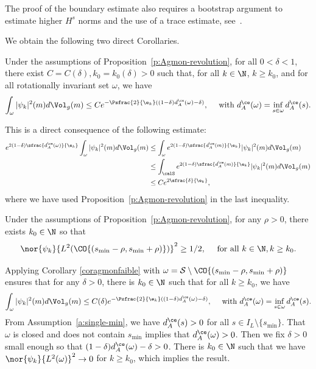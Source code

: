 The proof of the boundary estimate also requires a bootstrap argument to estimate higher $H^s$ norms and the use of a trace estimate, see~\cite[Prop.\,3.3.1 \&~3.3.4]{Helffer:booksemiclassic}.

We obtain the following two direct Corollaries.
\begin{corollary}
\label{coragmonfaible}
Under the assumptions of Proposition~\ref{p:Agmon-revolution}, for all $0<\delta< 1$, there exist $C=C(\delta),k_0=k_0(\delta)>0$ such that, for all $k \in \N$, $k \geq k_0$, and for all rotationally invariant set $\omega$, we have
\[
\int_{\omega} |\psi_k|^2(m) d\Vol_g(m)
\leq C e^{-\Psfrac{2}{\e_k} ((1-\delta)d_A^{\ce}(\omega) - \delta) }, \quad \text{ with } d_A^{\ce}(\omega) = \inf_{s\in \omega} d_A^{\ce}(s).
\]
\end{corollary}
\bnp
This is a direct consequence of the following estimate:
\begin{align*}
e^{2(1-\delta)\sfrac{ d_A^{\ce}(\omega)}{\e_k}} \int_{\omega} |\psi_k|^2(m) d\Vol_g(m) & \leq\int_{\omega} e^{2(1-\delta)\sfrac{ d_A^{\ce}(m)}{\e_k}} |\psi_k|^2(m) d\Vol_g(m) \\
& \leq \int_{\calS} e^{2(1-\delta)\sfrac{ d_A^{\ce}(m)}{\e_k}} |\psi_k|^2(m) d\Vol_g(m)\\
&\leq C e^{2\sfrac{\delta}{\e_k}},
\end{align*}
where we have used Proposition~\ref{p:Agmon-revolution} in the last inequality.
\enp
\begin{corollary}
\label{corpresx0}
Under the assumptions of Proposition~\ref{p:Agmon-revolution}, for any $\rho>0$, there exists $k_0\in \N$ so that
\[
\nor{\psi_k}{L^2(\CO{(s_{\min}-\rho, s_{\min} +\rho)})}^2\geq 1/2, \quad \text{ for all } k\in \N, k\geq k_0.
\]
\end{corollary}
\bnp
Applying Corollary \ref{coragmonfaible} with $\omega=\mathcal{S}\setminus\CO{(s_{\min}-\rho, s_{\min} +\rho)}$ ensures that for any $\delta>0$, there is $k_0\in \N$ such that for all $k\geq k_0$, we have
\[
\int_{\omega} |\psi_k|^2(m) d\Vol_g(m)
\leq C(\delta) e^{-\Psfrac{2}{\e_k} ((1-\delta)d_A^{\ce}(\omega) - \delta) }, \quad \text{ with } d_A^{\ce}(\omega) = \inf_{s\in \omega} d_A^{\ce}(s).
\]
From Assumption~\ref{a:single-min}, we have $d_A^{\ce}(s)>0$ for all $s \in I_L\setminus \{s_{\min}\}$. That $\omega$ is closed and does not contain $s_{\min}$ implies that $d_A^{\ce}(\omega)>0$.
Then we fix $\delta>0$ small enough so that $(1-\delta)d_A^{\ce}(\omega) - \delta>0$. There is $k_0\in \N$ such that we have $\nor{\psi_k}{L^2(\omega)}^2 \to 0$ for $k \geq k_0$, which implies the result.
\enp

